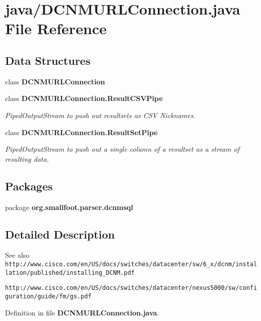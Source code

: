 \section{java/\+D\+C\+N\+M\+U\+R\+L\+Connection.java File Reference}
\label{DCNMURLConnection_8java}
\subsection*{Data Structures}
\begin{DoxyCompactItemize}
\item 
class {\bf D\+C\+N\+M\+U\+R\+L\+Connection}
\item 
class {\bfseries D\+C\+N\+M\+U\+R\+L\+Connection.\+Result\+C\+S\+V\+Pipe}
\begin{DoxyCompactList}\small\item\em Piped\+Output\+Stream to push out resultsets as C\+S\+V Nicknames. \end{DoxyCompactList}\item 
class {\bfseries D\+C\+N\+M\+U\+R\+L\+Connection.\+Result\+Set\+Pipe}
\begin{DoxyCompactList}\small\item\em Piped\+Output\+Stream to push out a single column of a resultset as a stream of resulting data. \end{DoxyCompactList}\end{DoxyCompactItemize}
\subsection*{Packages}
\begin{DoxyCompactItemize}
\item 
package {\bf org.\+smallfoot.\+parser.\+dcnmsql}
\end{DoxyCompactItemize}


\subsection{Detailed Description}
\begin{DoxySeeAlso}{See also}
{\tt http\+://www.\+cisco.\+com/en/\+U\+S/docs/switches/datacenter/sw/6\+\_\+x/dcnm/installation/published/installing\+\_\+\+D\+C\+N\+M.\+pdf} 

{\tt http\+://www.\+cisco.\+com/en/\+U\+S/docs/switches/datacenter/nexus5000/sw/configuration/guide/fm/gs.\+pdf} 
\end{DoxySeeAlso}


Definition in file {\bf D\+C\+N\+M\+U\+R\+L\+Connection.\+java}.

